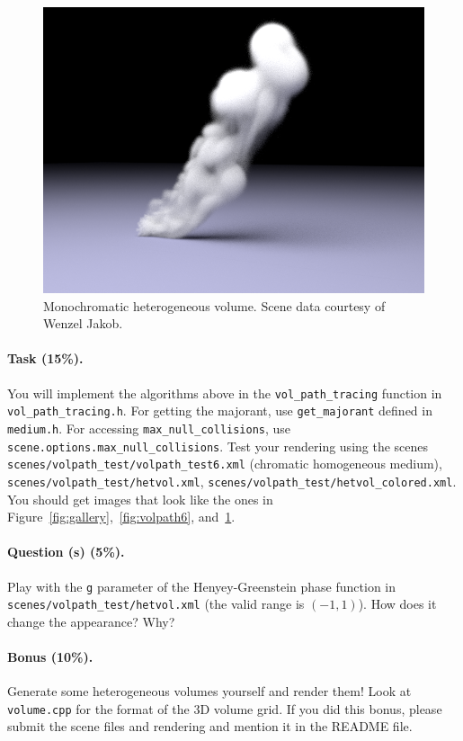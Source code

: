 \begin{figure}
\centering
\includegraphics[width=0.48\linewidth]{imgs/hetvol.png}
\caption{Monochromatic heterogeneous volume. Scene data courtesy of Wenzel Jakob.}
\label{fig:hetvol}
\end{figure}

\paragraph{Task (15\%).} You will implement the algorithms above in the \lstinline{vol_path_tracing} function in \lstinline{vol_path_tracing.h}. For getting the majorant, use \lstinline{get_majorant} defined in \lstinline{medium.h}. For accessing \lstinline{max_null_collisions}, use \lstinline{scene.options.max_null_collisions}. Test your rendering using the scenes \lstinline{scenes/volpath_test/volpath_test6.xml} (chromatic homogeneous medium), \lstinline{scenes/volpath_test/hetvol.xml},  \lstinline{scenes/volpath_test/hetvol_colored.xml}. You should get images that look like the ones in Figure~\ref{fig:gallery},~\ref{fig:volpath6}, and~\ref{fig:hetvol}.

\paragraph{Question (s) (5\%).} Play with the \lstinline{g} parameter of the Henyey-Greenstein phase function in \lstinline{scenes/volpath_test/hetvol.xml} (the valid range is $(-1, 1)$). How does it change the appearance? Why? 

\paragraph{Bonus (10\%).} Generate some heterogeneous volumes yourself and render them! Look at \lstinline{volume.cpp} for the format of the 3D volume grid. If you did this bonus, please submit the scene files and rendering and mention it in the README file.




